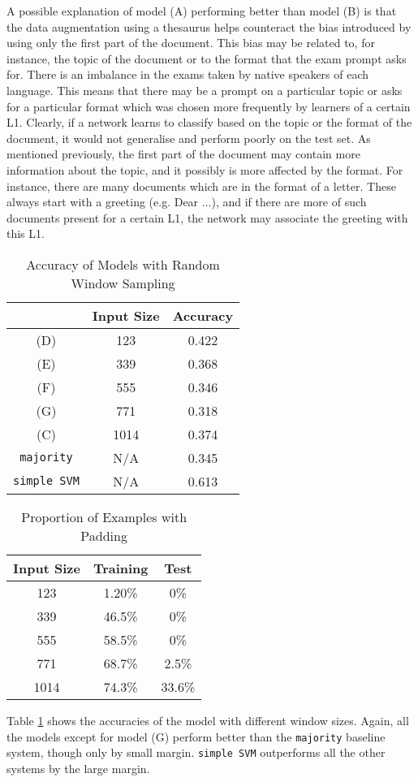 A possible explanation of model (A) performing better than model (B) is that the data augmentation using a thesaurus helps counteract  the bias introduced by using only the first part of the document.
This bias may be related to, for instance, the topic of the document or to the format that the exam prompt asks for.
There is an imbalance in the exams taken by native speakers of each language.
This means that there may be a prompt on a particular topic or asks for a particular format which was chosen more frequently by learners of a certain L1. 
Clearly, if a network learns to classify based on the topic or the format of the document, it would not generalise and perform poorly on the test set.
As mentioned previously, the first part of the document may contain more information about the topic, and it possibly is more affected by the format.
For instance, there are many documents which are in the format of a letter.
These always start with a greeting (e.g. Dear ...), and if there are more of such documents present for a certain L1, the network may associate the greeting with this L1.

\begin{table}[h]
\centering
\caption{Accuracy of Models with Random Window Sampling}
\label{tab:r_w_s}
\begin{tabular}{ccc}
&Input Size & Accuracy \\ \hline
(D)&123        & 0.422      \\
(E)&339        & 0.368      \\
(F)&555        & 0.346      \\
(G)&771        & 0.318      \\
(C)&1014       & 0.374    \\
\texttt{majority}  & N/A & 0.345 \\
\texttt{simple SVM} & N/A & 0.613 
\end{tabular}
\end{table}
\begin{table}[h]
\centering
\caption{Proportion of Examples with Padding}
\label{tab:padding}
\begin{tabular}{ccc}
Input Size & Training & Test \\ \hline
123        & 1.20\%  &   0\% \\
339        & 46.5\%    & 0\%\\
555        & 58.5\%    & 0\% \\
771        & 68.7\%     &2.5\% \\
1014       & 74.3\%    &33.6\%
\end{tabular}
\end{table}
Table \ref{tab:r_w_s} shows the accuracies of the model with different window sizes.
Again, all the models except for model (G) perform better than the \texttt{majority} baseline system, though only by small margin.
\texttt{simple SVM} outperforms all the other systems by the large margin.

